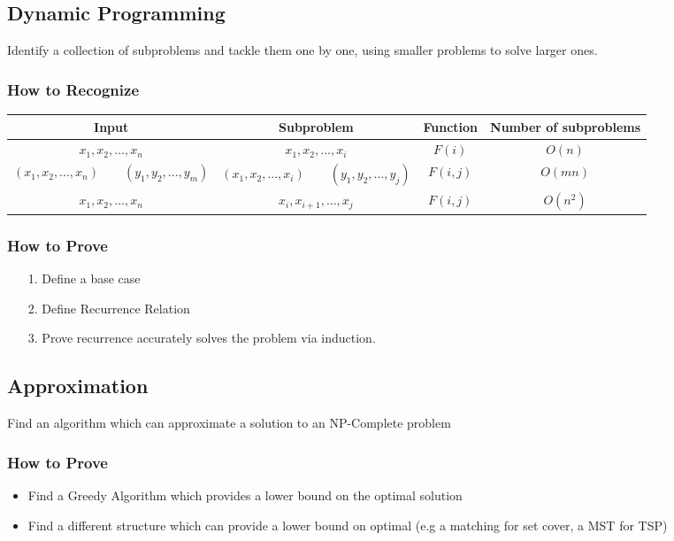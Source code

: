 \documentclass{article}
\begin{document}
\subsection*{Dynamic Programming}
Identify a collection of subproblems and tackle them one by one, using smaller problems to solve larger ones.
\subsubsection*{How to Recognize}
\begin{center}
    \begin{tabular}{c|c|c|c}
        \hline
        \textbf{Input} & \textbf{Subproblem} & \textbf{Function} & \textbf{Number of subproblems}\\
        \hline
        $x_1, x_2,...,x_n$ & $x_1,x_2,...,x_i$ & $F(i)$ & $O(n)$\\
        \hline
        $(x_1, x_2,...,x_n)\qquad (y_1,y_2,...,y_m)$ & $(x_1, x_2,...,x_i)\qquad (y_1,y_2,...,y_j)$ & $F(i, j)$ & $O(mn)$\\
        \hline
        $x_1, x_2,...,x_n$ & $x_i,x_{i+1},...,x_j$ & $F(i, j)$ & $O(n^2)$\\
        \hline

    \end{tabular}
\end{center}
\subsubsection*{How to Prove}
\begin{itemize}
    \item[1.] Define a base case
    \item[2.] Define Recurrence Relation
    \item[3.] Prove recurrence accurately solves the problem via induction.
\end{itemize}
\noindent\makebox[\linewidth]{\rule{\textwidth}{0.4pt}}
\subsection*{Approximation}
Find an algorithm which can approximate a solution to an NP-Complete problem
\subsubsection*{How to Prove}
\begin{itemize}
    \item Find a Greedy Algorithm which provides a lower bound on the optimal solution
    \item Find a different structure which can provide a lower bound on optimal (e.g a matching for set cover, a MST for TSP) 
\end{itemize}
\pagebreak
\end{document}
